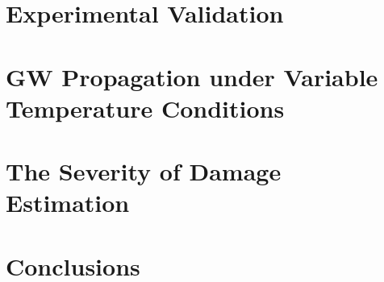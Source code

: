 \documentclass[11pt,a4paper,final]{report}
\begin{document}
\clearpage{}
\clearpage{}

\chapter[Experimental Validation]{Experimental Validation}
\label{ch:validation}






%
\clearpage{}
\clearpage{}

\chapter[GW Propagation under Variable Temperature Conditions]{GW Propagation under Variable Temperature Conditions}
\label{ch:tempEffects}






%
\clearpage{}
\clearpage{}

\chapter[The Severity of Damage Estimation]{The Severity of Damage Estimation}
\label{ch:severity}





%
\clearpage{}
\clearpage{}

\chapter[Conclusions]{Conclusions}
\label{ch:conclusions}







%
\clearpage{}
\clearpage{}





\appendix
\clearpage{}
\clearpage{}\printindex
\clearpage{}

\printbibliography
\end{document}
